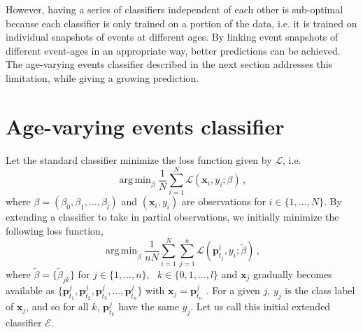 \documentclass[a4paper,11pt]{article}
\DeclareMathOperator*{\argmin}{arg\,min}
\begin{document}
However, having a series of classifiers independent of each other is sub-optimal because each classifier is only trained on a portion of the data, i.e. it is trained on  individual snapshots of events at different ages. By linking event snapshots of different event-ages in an appropriate way,  better predictions can be achieved.  The age-varying events classifier described in the next section addresses this limitation, while giving a growing prediction. 



\section{Age-varying events classifier}\label{sec:ExtendedClassifier}

Let the standard classifier minimize the loss function given by $\mathscr{L}$, i.e.
$$
  \argmin_\beta \frac{1}{N}\sum_{i=1}^N \mathscr{L}(\bm{x}_i,y_i;\beta) \, ,
$$
where $\beta = \left( \beta_0, \beta_1, \dots, \beta_l \right)$ and $(\bm{x}_i, y_i)$ are observations for $i \in \{ 1, \dots, N \}$. By extending a classifier to take in partial observations, we initially minimize the following loss function,
$$
  \argmin_{\tilde{\beta}} \frac{1}{nN} \sum_{i=1}^N \sum_{j=1}^n \mathscr{L} ( \bm{p}^i_{t_j},y_i;\tilde{\beta}) \, ,
$$
where $\tilde{\beta} = \{ \tilde{\beta}_{jk} \}$ for $j \in \{1, \dots, n\}$, \, $k \in \{0, 1, \dots, l \}$ and $\bm{x}_j$ gradually becomes available as $\{\bm{p}^j_{t_1},\bm{p}^j_{t_2}, \bm{p}^j_{t_3}, \dots, \bm{p}^j_{t_n} \}$ with $\bm{x}_j = \bm{p}_{t_n}^j$ . For a given $j$, $y_j$ is the class label of $\bm{x}_j$, and so for all $k$, $\bm{p}^j_{t_k}$ have the same $y_j$. Let us call this initial extended classifier $\mathscr{E}$.
\end{document}
